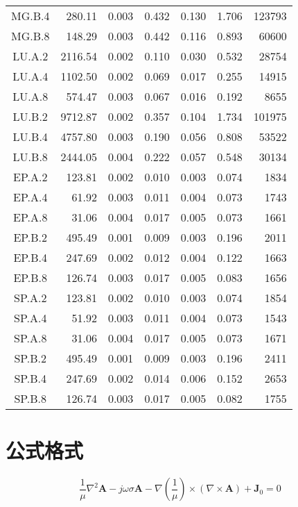 \begin{ThreePartTable}
\begin{longtable}[c]{c*{6}{r}}
    MG.B.4 & 280.11 & 0.003 & 0.432 & 0.130 & 1.706 & 123793 \\
    MG.B.8 & 148.29 & 0.003 & 0.442 & 0.116 & 0.893 & 60600 \\
    LU.A.2 & 2116.54 & 0.002 & 0.110 & 0.030 & 0.532 & 28754 \\
    LU.A.4 & 1102.50 & 0.002 & 0.069 & 0.017 & 0.255 & 14915 \\
    LU.A.8 & 574.47 & 0.003 & 0.067 & 0.016 & 0.192 & 8655 \\
    LU.B.2 & 9712.87 & 0.002 & 0.357 & 0.104 & 1.734 & 101975 \\
    LU.B.4 & 4757.80 & 0.003 & 0.190 & 0.056 & 0.808 & 53522 \\
    LU.B.8 & 2444.05 & 0.004 & 0.222 & 0.057 & 0.548 & 30134 \\
    EP.A.2 & 123.81 & 0.002 & 0.010 & 0.003 & 0.074 & 1834 \\
    EP.A.4 & 61.92 & 0.003 & 0.011 & 0.004 & 0.073 & 1743 \\
    EP.A.8 & 31.06 & 0.004 & 0.017 & 0.005 & 0.073 & 1661 \\
    EP.B.2 & 495.49 & 0.001 & 0.009 & 0.003 & 0.196 & 2011 \\
    EP.B.4 & 247.69 & 0.002 & 0.012 & 0.004 & 0.122 & 1663 \\
    EP.B.8 & 126.74 & 0.003 & 0.017 & 0.005 & 0.083 & 1656 \\
    SP.A.2 & 123.81 & 0.002 & 0.010 & 0.003 & 0.074 & 1854 \\
    SP.A.4 & 51.92 & 0.003 & 0.011 & 0.004 & 0.073 & 1543 \\
    SP.A.8 & 31.06 & 0.004 & 0.017 & 0.005 & 0.073 & 1671 \\
    SP.B.2 & 495.49 & 0.001 & 0.009 & 0.003 & 0.196 & 2411 \\
    SP.B.4 \tnote{a} & 247.69 & 0.002 & 0.014 & 0.006 & 0.152 & 2653 \\
    SP.B.8 \tnote{b} & 126.74 & 0.003 & 0.017 & 0.005 & 0.082 & 1755 \\
    \bottomrule
  \end{longtable}
\end{ThreePartTable}

\section{公式格式}

\begin{equation}\label{eq:example}
  \frac{1}{\mu}\nabla^2\mathbf{A}-j\omega\sigma\mathbf{A}
  -\nabla\left(\frac{1}{\mu}\right)\times(\nabla\times\mathbf{A})
  +\mathbf{J}_0=0
\end{equation}

